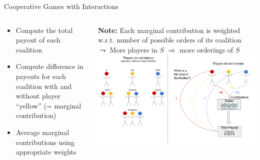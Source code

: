 \documentclass[11pt,compress,t,notes=noshow, aspectratio=169, xcolor=table]{beamer}
\begin{document}
\begin{frame}{Cooperative Games with Interactions}
\begin{columns}[T, totalwidth=\linewidth]
\begin{column}{0.53\textwidth}
\scriptsize
\begin{itemize}
\itemsep0em
    \item Compute the total payout of each coalition
    \item Compute difference in payouts for each coalition with and without player \enquote{yellow} (= marginal contribution)
    \item Average marginal contributions using appropriate weights
\end{itemize}
\end{column}
\begin{column}{0.47\textwidth}
\pause
\textbf{Note:} Each marginal contribution is weighted w.r.t. number of possible orders of its coalition\\
$\leadsto$ More players in $S$ $\Rightarrow$ more orderings of $S$
\includegraphics[page=7, width = \textwidth, trim=182px 10px 0px 10px, clip]{figure/Shapley.pdf}
\end{column}
\end{columns}
\end{frame}

\end{document}
